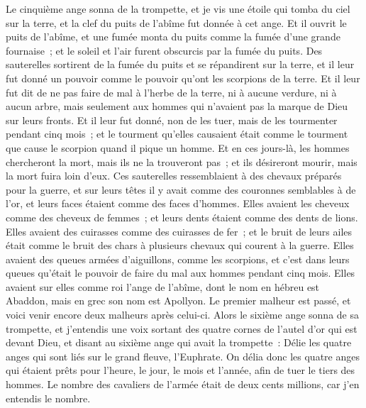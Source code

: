 \begin{multicols}{2}
\VerseOne{}Le cinquième ange sonna de la trompette, et je vis une étoile qui tomba du ciel sur la terre, et la clef du puits de l'abîme fut donnée à cet ange.
Et il ouvrit le puits de l'abîme, et une fumée monta du puits comme la fumée d'une grande fournaise~; et le soleil et l'air furent obscurcis par la fumée du puits.
Des sauterelles sortirent de la fumée du puits et se répandirent sur la terre, et il leur fut donné un pouvoir comme le pouvoir qu'ont les scorpions de la terre.
Et il leur fut dit de ne pas faire de mal à l'herbe de la terre, ni à aucune verdure, ni à aucun arbre, mais seulement aux hommes qui n'avaient pas la marque de Dieu sur leurs fronts.
Et il leur fut donné, non de les tuer, mais de les tourmenter pendant cinq mois~; et le tourment qu'elles causaient était comme le tourment que cause le scorpion quand il pique un homme.
Et en ces jours-là, les hommes chercheront la mort, mais ils ne la trouveront pas~; et ils désireront mourir, mais la mort fuira loin d'eux.
Ces sauterelles ressemblaient à des chevaux préparés pour la guerre, et sur leurs têtes il y avait comme des couronnes semblables à de l'or, et leurs faces étaient comme des faces d'hommes.
Elles avaient les cheveux comme des cheveux de femmes~; et leurs dents étaient comme des dents de lions.
Elles avaient des cuirasses comme des cuirasses de fer~; et le bruit de leurs ailes était comme le bruit des chars à plusieurs chevaux qui courent à la guerre.
Elles avaient des queues armées d'aiguillons, comme les scorpions, et c'est dans leurs queues qu'était le pouvoir de faire du mal aux hommes pendant cinq mois.
Elles avaient sur elles comme roi l'ange de l'abîme, dont le nom en hébreu est Abaddon, mais en grec son nom est Apollyon.
Le premier malheur est passé, et voici venir encore deux malheurs après celui-ci.
Alors le sixième ange sonna de sa trompette, et j'entendis une voix sortant des quatre cornes de l'autel d'or qui est devant Dieu,
et disant au sixième ange qui avait la trompette~: Délie les quatre anges qui sont liés sur le grand fleuve, l'Euphrate.
On délia donc les quatre anges qui étaient prêts pour l'heure, le jour, le mois et l'année, afin de tuer le tiers des hommes.
Le nombre des cavaliers de l'armée était de deux cents millions, car j'en entendis le nombre.

\end{multicols}
